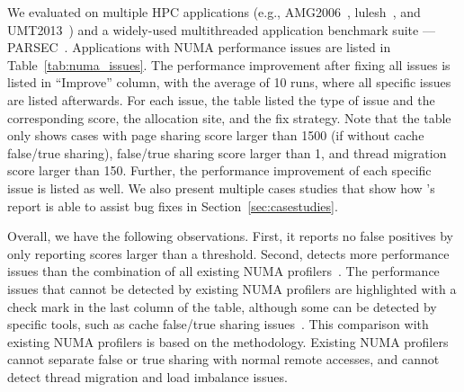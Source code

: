 We evaluated \NP{} on multiple HPC applications (e.g.,  AMG2006~\cite{AMG2006}, lulesh~\cite{LULESH}, and UMT2013~\cite{UMT2013}) and a widely-used multithreaded application benchmark suite --- PARSEC~\cite{parsec}.  Applications with NUMA performance issues are listed in Table~\ref{tab:numa_issues}.  The performance improvement after fixing all issues is listed in ``Improve'' column, with the average of 10 runs, where all specific issues are listed afterwards. For each  issue, the table listed the type of issue and the corresponding score, the allocation site, and the fix strategy. Note that the table only shows cases with page sharing score larger than 1500 (if without cache false/true sharing), false/true sharing score larger than 1, and thread migration score larger than 150. Further, the performance improvement of each specific issue is listed as well. We also present multiple cases studies that show how \NP{}'s report is able to assist bug fixes in Section~\ref{sec:casestudies}.   

Overall, we have the following observations. First, it reports no false positives by only reporting scores larger than a threshold. Second, \NP{} 
detects more performance issues than the combination of all existing NUMA profilers~\cite{Intel:VTune, Memphis, Lachaize:2012:MMP:2342821.2342826, XuNuma, NumaMMA, 7847070, diener2015characterizing, valat:2018:numaprof}. The performance issues that cannot be detected by existing NUMA profilers are highlighted with a check mark in the last column of the table, although some can be detected by specific tools, such as cache false/true sharing issues~\cite{Sheriff, Predator, Cheetah, DBLP:conf/ppopp/ChabbiWL18, helm2019perfmemplus}. This comparison with existing NUMA profilers is based on the methodology. Existing NUMA profilers cannot separate false or true sharing with normal remote accesses, and cannot detect thread migration and load imbalance issues.

